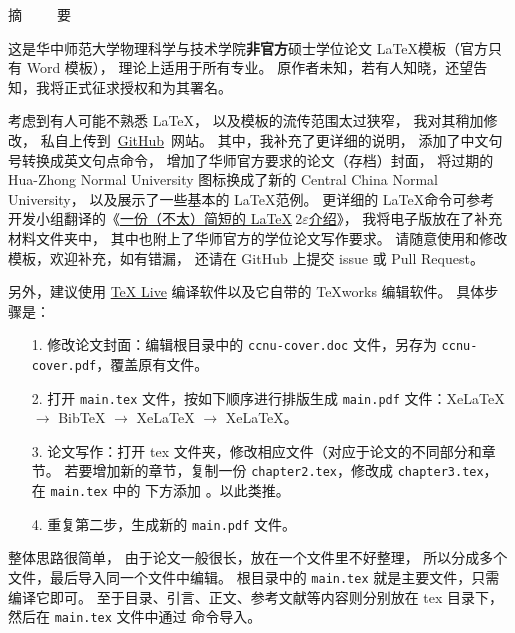 \newpage
 \vspace{1.0cm}
 \headsep=1.5cm
 \centerline{\hei \sanhao 摘\ \ \ \ \ 要}
 \label{zhaiyao}
\vspace{0.5cm}
 \pagestyle{fancy}
 \fancyfoot[C]{---\thepage---}

这是华中师范大学物理科学与技术学院\textbf{非官方}硕士学位论文 \LaTeX 模板（官方只有 Word 模板），
理论上适用于所有专业。
原作者未知，若有人知晓，还望告知，我将正式征求授权和为其署名。

考虑到有人可能不熟悉 \LaTeX，
以及模板的流传范围太过狭窄，
我对其稍加修改，
私自上传到~\href{https://github.com/ichenh/ccnu-latex}{GitHub}~网站。
其中，我补充了更详细的说明，
添加了中文句号转换成英文句点命令，
增加了华师官方要求的论文（存档）封面，
将过期的 Hua-Zhong Normal University 图标换成了新的 Central China Normal University，
以及展示了一些基本的 \LaTeX 范例。
更详细的 \LaTeX 命令可参考 \CTeX 开发小组翻译的《\href{http://mirrors.ibiblio.org/CTAN/info/lshort/chinese/lshort-zh-cn.pdf}{一份（不太）简短的 \LaTeX $\ 2\varepsilon$介绍}》，
我将电子版放在了补充材料文件夹中，
其中也附上了华师官方的学位论文写作要求。
请随意使用和修改模板，欢迎补充，如有错漏，
还请在 GitHub 上提交 issue 或 Pull Request。

另外，建议使用 \href{https://ctan.org/mirrors/mirmon#cn}{TeX Live} 编译软件以及它自带的 TeXworks 编辑软件。
具体步骤是：

\begin{itemize}
\item[1.] 修改论文封面：编辑根目录中的 \verb!ccnu-cover.doc! 文件，另存为 \verb!ccnu-cover.pdf!，覆盖原有文件。
\item[2.] 打开 \verb!main.tex! 文件，按如下顺序进行排版生成 \verb!main.pdf! 文件：XeLaTeX $\to$ BibTeX $\to$ XeLaTeX $\to$ XeLaTeX。
\item[3.] 论文写作：打开 tex 文件夹，修改相应文件（对应于论文的不同部分和章节。
若要增加新的章节，复制一份 \verb!chapter2.tex!，修改成 \verb!chapter3.tex!，
在 \verb!main.tex! 中的 \verb!! 下方添加 \verb!!。以此类推。
\item[4.] 重复第二步，生成新的 \verb!main.pdf! 文件。
\end{itemize}

整体思路很简单，
由于论文一般很长，放在一个文件里不好整理，
所以分成多个文件，最后导入同一个文件中编辑。
根目录中的 \verb!main.tex! 就是主要文件，只需编译它即可。
至于目录、引言、正文、参考文献等内容则分别放在 tex 目录下，
然后在 \verb!main.tex! 文件中通过 \verb!! 命令导入。

